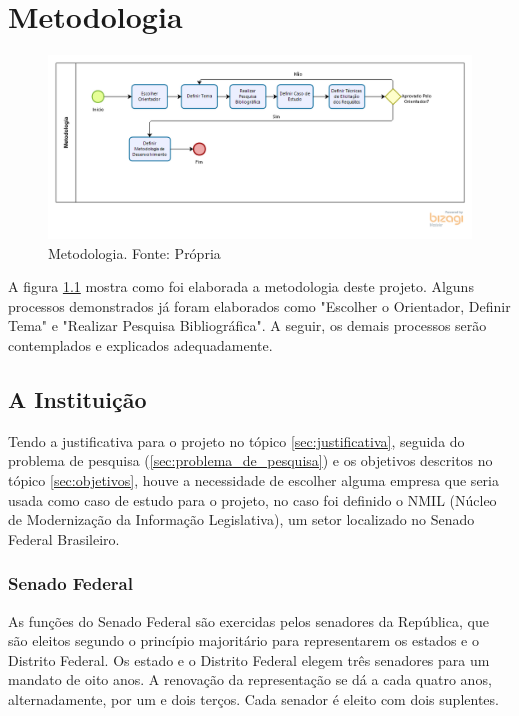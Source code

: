 \chapter[Metodologia]{Metodologia}
\label{cp:metodologia}

\begin{figure}[H]
	\centering
	\includegraphics[width=1.0\textwidth]{figuras/metodologia.png}
	\caption{Metodologia. Fonte: Própria}
	\label{img:metodologia}
\end{figure}

A figura \ref{img:metodologia} mostra como foi elaborada a metodologia deste projeto. Alguns processos demonstrados já foram elaborados como "Escolher o Orientador, Definir Tema" e "Realizar Pesquisa Bibliográfica". A seguir, os demais processos serão contemplados e explicados adequadamente.

\section{A Instituição}

Tendo a justificativa para o projeto no tópico \ref{sec:justificativa}, seguida do problema de pesquisa (\ref{sec:problema_de_pesquisa}) e os objetivos descritos no tópico \ref{sec:objetivos}, houve a necessidade de escolher alguma empresa que seria usada como caso de estudo para o projeto, no caso foi definido o NMIL (Núcleo de Modernização da Informação Legislativa), um setor localizado no Senado Federal Brasileiro.

\subsection{Senado Federal}

As funções do Senado Federal são exercidas pelos senadores da República, que são eleitos segundo o princípio majoritário para representarem os estados e o Distrito Federal. Os estado e o Distrito Federal elegem três senadores para um mandato de oito anos. A renovação da representação se dá a cada quatro anos, alternadamente, por um e dois terços. Cada senador é eleito com dois suplentes.

